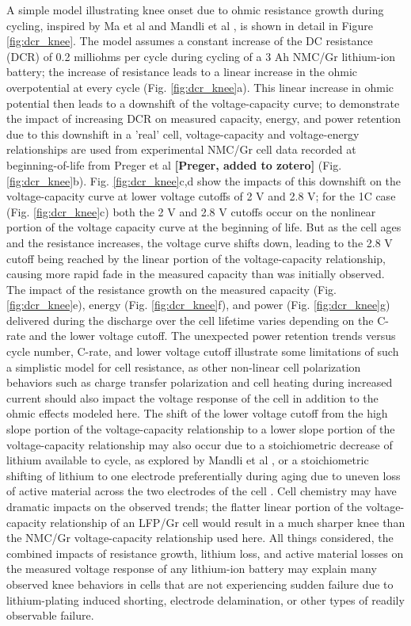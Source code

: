 \documentclass{article}
\begin{document}
A simple model illustrating knee onset due to ohmic resistance growth during cycling, inspired by Ma et al \cite{ma_editors_2019} and Mandli et al \cite{mandli_analysis_2019}, is shown in detail in Figure \ref{fig:dcr_knee}. The model assumes a constant increase of the DC resistance (DCR) of 0.2 milliohms per cycle during cycling of a 3 Ah NMC/Gr lithium-ion battery; the increase of resistance leads to a linear increase in the ohmic overpotential at every cycle (Fig. \ref{fig:dcr_knee}a). This linear increase in ohmic potential then leads to a downshift of the voltage-capacity curve; to demonstrate the impact of increasing DCR on measured capacity, energy, and power retention due to this downshift in a 'real' cell, voltage-capacity and voltage-energy relationships are used from experimental NMC/Gr cell data recorded at beginning-of-life from Preger et al \textbf{[Preger, added to zotero]} (Fig. \ref{fig:dcr_knee}b). Fig. \ref{fig:dcr_knee}c,d show the impacts of this downshift on the voltage-capacity curve at lower voltage cutoffs of 2 V and 2.8 V; for the 1C case (Fig. \ref{fig:dcr_knee}c) both the 2 V and 2.8 V cutoffs occur on the nonlinear portion of the voltage capacity curve at the beginning of life. But as the cell ages and the resistance increases, the voltage curve shifts down, leading to the 2.8 V cutoff being reached by the linear portion of the voltage-capacity relationship, causing more rapid fade in the measured capacity than was initially observed. The impact of the resistance growth on the measured capacity (Fig. \ref{fig:dcr_knee}e), energy (Fig. \ref{fig:dcr_knee}f), and power (Fig. \ref{fig:dcr_knee}g) delivered during the discharge over the cell lifetime varies depending on the C-rate and the lower voltage cutoff. The unexpected power retention trends versus cycle number, C-rate, and lower voltage cutoff illustrate some limitations of such a simplistic model for cell resistance, as other non-linear cell polarization behaviors such as charge transfer polarization and cell heating during increased current should also impact the voltage response of the cell in addition to the ohmic effects modeled here. The shift of the lower voltage cutoff from the high slope portion of the voltage-capacity relationship to a lower slope portion of the voltage-capacity relationship may also occur due to a stoichiometric decrease of lithium available to cycle, as explored by Mandli et al \cite{mandli_analysis_2019}, or a stoichiometric shifting of lithium to one electrode preferentially during aging due to uneven loss of active material across the two electrodes of the cell \cite{lin_comprehensive_2013}. Cell chemistry may have dramatic impacts on the observed trends; the flatter linear portion of the voltage-capacity relationship of an LFP/Gr cell would result in a much sharper knee than the NMC/Gr voltage-capacity relationship used here. All things considered, the combined impacts of resistance growth, lithium loss, and active material losses on the measured voltage response of any lithium-ion battery may explain many observed knee behaviors in cells that are not experiencing sudden failure due to lithium-plating induced shorting, electrode delamination, or other types of readily observable failure.
\end{document}
